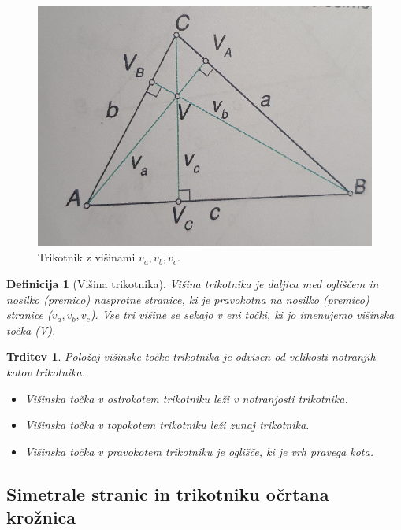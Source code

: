\documentclass{article}
\newtheorem{definicija}{Definicija}[subsection]
\newtheorem{trditev}{Trditev}[subsection]
\begin{document}
\begin{figure}[h]
    \includegraphics[width=\linewidth]{visineTrikotnika.png}
    \centering
    \caption{Trikotnik z višinami $v_a, v_b, v_c$.}
\end{figure}

\begin{definicija}[Višina trikotnika]
    Višina trikotnika je daljica med ogliščem in nosilko (premico) nasprotne stranice, ki je pravokotna na nosilko (premico) stranice ($v_a, v_b, v_c$). Vse tri višine se sekajo v eni točki, ki jo imenujemo višinska točka (V).
\end{definicija}

\begin{trditev}
    Položaj višinske točke trikotnika je odvisen od velikosti notranjih kotov trikotnika.
    \begin{itemize}
        \item Višinska točka v ostrokotem trikotniku leži v notranjosti trikotnika.
        \item Višinska točka v topokotem trikotniku leži zunaj trikotnika.
        \item Višinska točka v pravokotem trikotniku je oglišče, ki je vrh pravega kota. 
    \end{itemize}
\end{trditev}


\pagebreak
\subsection{ Simetrale stranic in trikotniku očrtana krožnica }
\end{document}
